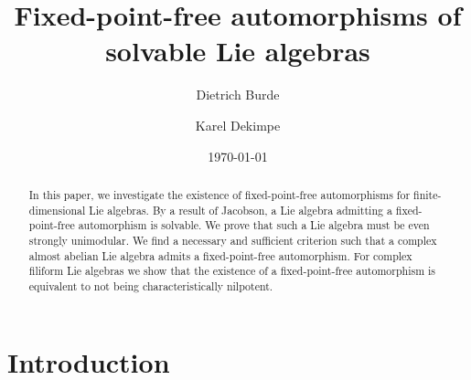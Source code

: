 \documentclass[12pt]{amsart}
\theoremstyle{definition}
\theoremstyle{remark}
\begin{document}

\title[]{Fixed-point-free automorphisms of solvable Lie algebras}
\author[D. Burde]{Dietrich Burde}
\author[K. Dekimpe]{Karel Dekimpe}
\address{Fakult\"at f\"ur Mathematik\\
Universit\"at Wien\\
Oskar-Morgenstern-Platz 1\\
1090 Wien \\
Austria}
\address{Katholieke Universiteit Leuven Campus Kulak Kortrijk\\
Etienne Sabbelaan 53\\
8500 Kortrijk\\
Belgium}
\date{\today}




\begin{abstract}
In this paper, we investigate the existence of fixed-point-free automorphisms for finite-dimensional
Lie algebras. By a result of Jacobson, a Lie algebra admitting a fixed-point-free automorphism
is solvable. We prove that such a Lie algebra must be even strongly unimodular. We find a necessary and
sufficient criterion such that  a complex almost abelian Lie algebra admits a fixed-point-free automorphism.
For complex filiform Lie algebras we show that the existence of a fixed-point-free automorphism is equivalent
to not being characteristically nilpotent. 
\end{abstract}


\maketitle

\section{Introduction}
\end{document}
